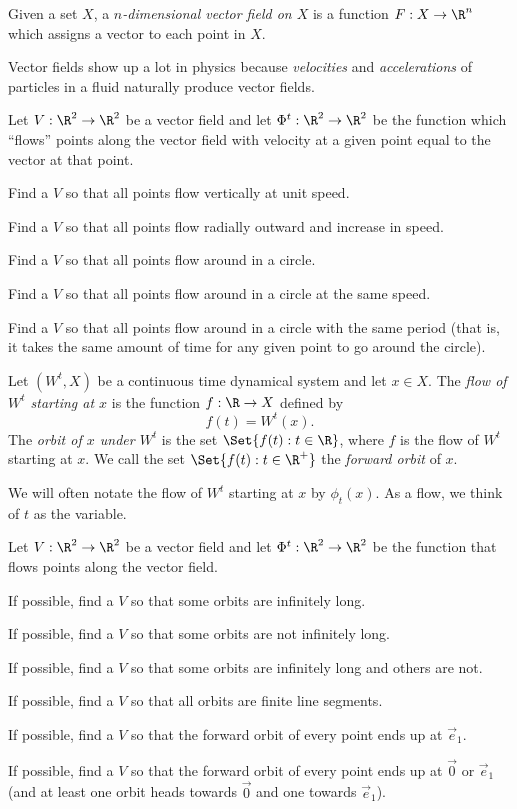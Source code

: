 	\newpage
	\begin{definition}
		Given a set $X$, a \emph{$n$-dimensional vector field on $X$} is a function $F:X\to \R^n$ which
		assigns a vector to each point in $X$.
	\end{definition}

	Vector fields show up a lot in physics because \emph{velocities} and \emph{accelerations} of particles in a fluid
	naturally produce vector fields.

	\question
		Let $V:\R^2\to\R^2$ be a vector field and let $\Phi^t:\R^2\to\R^2$ be the function which ``flows'' points along
		the vector field with velocity at a given point equal to the vector at that point.
	\begin{parts}
		\item Find a $V$ so that all points flow vertically at unit speed.
		\item Find a $V$ so that all points flow radially outward and increase in speed.
		\item Find a $V$ so that all points flow around in a circle.
		\item Find a $V$ so that all points flow around in a circle at the same speed.
		\item Find a $V$ so that all points flow around in a circle with the same period (that is, it takes the same
			amount of time for any given point to go around the circle).
	\end{parts}

	\begin{definition}
		Let $(W^t,X)$ be a continuous time dynamical system and let $x\in X$. 
		The \emph{flow of $W^t$ starting at $x$} is the function $f:\R\to X$ defined by
		\[
			f(t) = W^t(x).
		\]
		The \emph{orbit of $x$ under $W^t$} is the set $\Set{f(t):t\in \R}$, where $f$ is the flow of $W^t$
		starting at $x$. We call the set $\Set{f(t):t\in \R^+}$ the \emph{forward orbit} of $x$.
	\end{definition}
	We will often notate the flow of $W^t$ starting at $x$ by $\phi_t(x)$. As a flow, we think of $t$ as the variable.

	\question
		Let $V:\R^2\to\R^2$ be a vector field and let $\Phi^t:\R^2\to\R^2$ be the function that flows
		points along the vector field. 
	\begin{parts}
		\item If possible, find a $V$ so that some orbits are infinitely long.
		\item If possible, find a $V$ so that some orbits are not infinitely long.
		\item If possible, find a $V$ so that some orbits are infinitely long and others are not.
		\item If possible, find a $V$ so that all orbits are finite line segments.
		\item If possible, find a $V$ so that the forward orbit of every point ends up at $\vec e_1$.
		\item If possible, find a $V$ so that the forward orbit of every point ends up at $\vec 0$ or $\vec e_1$ (and
			at least one orbit heads towards $\vec 0$ and one towards $\vec e_1$).
	\end{parts}

